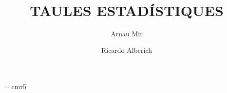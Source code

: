 \documentclass[11pt,a4paper]{article}
\newcounter{problema}
\begin{document}
\font\fiverm = cmr5
\newcommand{\bblref}[1]{{\bf \ref{#1}}}
\setcounter{problema}{0}
\setcounter{cas}{0}
\newcommand{\e}{{\rm e}}
\newcommand{\EE}{{\rm E}}
\newcommand{\Var}{{\rm Var}}
\newcommand{\Cov}{{\rm Cov}}
\newcommand{\pp}[1]{p\left\{#1\right\}}
\renewcommand{\thecas}{\Roman{cas}}
\newcommand{\posacas}{\addtocounter{cas}{1}{\bf \thecas}}
\newcommand{\text}[1]{\mbox{#1}}

\newenvironment{prob}
{\addtocounter{problema}{1}
\noindent
{\textbf{\thechapter.\theproblema.- }}}
{
\vspace{\baselineskip}}



\title{TAULES ESTADÍSTIQUES}


\author{Arnau Mir\and
Ricardo Alberich}
\maketitle
%
%
%

%
\end{document}
